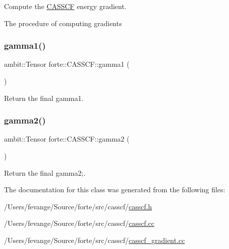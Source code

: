 Compute the \mbox{\hyperlink{classforte_1_1_c_a_s_s_c_f}{C\+A\+S\+S\+CF}} energy gradient. 

The procedure of computing gradients \mbox{\label{classforte_1_1_c_a_s_s_c_f_a221e64b6cc67b8d5aa6abc6b8023ef81}} 
\subsubsection{\texorpdfstring{gamma1()}{gamma1()}}
{\footnotesize\ttfamily ambit\+::\+Tensor forte\+::\+C\+A\+S\+S\+C\+F\+::gamma1 (\begin{DoxyParamCaption}{ }\end{DoxyParamCaption})\hspace{0.3cm}{\ttfamily [inline]}}



Return the final gamma1. 

\mbox{\label{classforte_1_1_c_a_s_s_c_f_a2fc7d80dcaa59c4c10af2c0764663875}} 
\subsubsection{\texorpdfstring{gamma2()}{gamma2()}}
{\footnotesize\ttfamily ambit\+::\+Tensor forte\+::\+C\+A\+S\+S\+C\+F\+::gamma2 (\begin{DoxyParamCaption}{ }\end{DoxyParamCaption})\hspace{0.3cm}{\ttfamily [inline]}}



Return the final gamma2;. 



The documentation for this class was generated from the following files\+:\begin{DoxyCompactItemize}
\item 
/\+Users/fevange/\+Source/forte/src/casscf/\mbox{\hyperlink{casscf_8h}{casscf.\+h}}\item 
/\+Users/fevange/\+Source/forte/src/casscf/\mbox{\hyperlink{casscf_8cc}{casscf.\+cc}}\item 
/\+Users/fevange/\+Source/forte/src/casscf/\mbox{\hyperlink{casscf__gradient_8cc}{casscf\+\_\+gradient.\+cc}}\end{DoxyCompactItemize}
